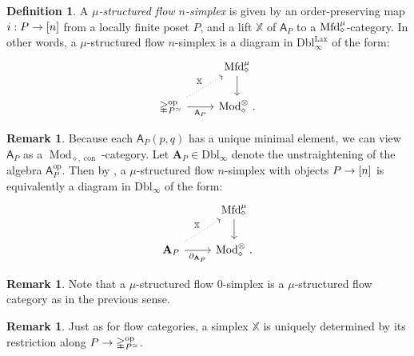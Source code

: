 \documentclass[10pt]{amsart}
\numberwithin{equation}{section}
\theoremstyle{definition}
\newtheorem{definition}[prop]{Definition}
\newtheorem{rem}[prop]{Remark}
\DeclareMathOperator{\Mod}{Mod}
\DeclareMathOperator{\op}{op}
\DeclareMathOperator{\Lax}{Lax}
\DeclareMathOperator{\con}{con}
\newcommand{\Mfd}{\mathrm{Mfd}\vphantom{d}}
\newcommand{\bX}{\mathbb{X}}
\newcommand{\Simp}{\mathbb{\Delta}}
\newcommand{\bfA}{\mathbf{A}}
\newcommand{\sfA}{\mathsf{A}}
\newcommand{\Dbl}{\mathrm{Dbl}}
\newcommand{\DblLax}{ \mathrm{Dbl}_{\infty}^{\Lax}  }
\newcommand{\del}{\partial}
\renewcommand{\to}{\mathchoice{\longrightarrow}{\rightarrow}{}{}}
\begin{document}
\begin{definition}\label{def:structured_flow_simplex}
	A \emph{$\mu$-structured flow $n$-simplex} is given by an order-preserving map $i : P\to [n]$ from a locally finite poset $P$, and a lift $\bX$ of $\sfA_{P}$ to a $\Mfd_{\diamond}^{\mu}$-category.
	In other words, a $\mu$-structured flow $n$-simplex is a diagram in $\DblLax$ of the form:
	\begin{equation*}
		\begin{tikzcd}
			& \Mfd_{\diamond}^{\mu} \arrow[d] \\
			\Simp_{P^{\simeq}}^{\op} \arrow[ur, dotted, "\bX"] \arrow[r, "\sfA_{P}"'] & \Mod_{\diamond}^{\otimes} \,.
		\end{tikzcd}
	\end{equation*}
\end{definition}

\begin{rem}\label{rem:flow_simplex_as_double_functor}
	Because each $\sfA_{P}(p,q)$ has a unique minimal element, we can view~$\sfA_{P}$ as a $\Mod_{\diamond,\con}$-category.
	Let $\bfA_{P} \in \Dbl_{\infty}$ denote the unstraightening of the algebra $\sfA_{P}^{\op}$.
	Then by , a $\mu$-structured flow $n$-simplex with objects $P\to [n]$ is equivalently a diagram in $\Dbl_{\infty}$ of the form:
	\begin{equation*}
		\begin{tikzcd}
			 & \Mfd_{\diamond}^{\mu} \arrow[d] \\
		\bfA_{P} \arrow[ur, dotted, "\bX"] \arrow[r, "\del_{\bfA_{P}}"']	& \Mod_{\diamond}^{\otimes} \,.
		\end{tikzcd}
	\end{equation*}
\end{rem}

\begin{rem}\label{rem:zero_simplex_is_flow_cat}
	Note that a $\mu$-structured flow $0$-simplex is a $\mu$-structured flow category as in the previous sense.
\end{rem}
\begin{rem}
	Just as for flow categories, a simplex $\bX$ is uniquely determined by its restriction along $P\to \Simp^{\op}_{P^{\simeq}}$.
\end{rem}
\end{document}
